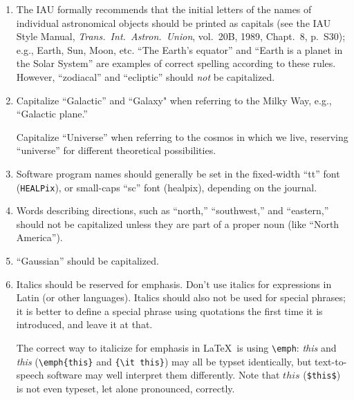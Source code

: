 \documentclass[letterpaper,11pt]{article}
\begin{document}
\begin{enumerate}
\item The IAU formally recommends that the initial letters of the names of
individual astronomical objects should be printed as capitals (see the IAU
Style Manual, {\it Trans.~Int.~Astron.~Union\/}, vol.~20B, 1989, Chapt.~8,
p.~S30); e.g., Earth, Sun, Moon, etc. ``The Earth's equator''
and ``Earth is a planet in the Solar System'' are examples of correct spelling
according to these rules.  However, ``zodiacal'' and ``ecliptic''
should {\it not\/} be capitalized.

\item Capitalize ``Galactic'' and ``Galaxy" when referring to the Milky Way, e.g.,
``Galactic plane.''

Capitalize ``Universe'' when referring to the cosmos in which we live,
reserving ``universe'' for different theoretical possibilities.


\item Software program names should generally be set in the fixed-width ``tt'' font ({\tt HEALPix}), or small-caps ``sc'' font ({\sc healpix}), depending on the journal.


\item  Words describing directions, such as ``north,'' ``southwest,'' and
``eastern,'' should not be capitalized unless they are part of a proper noun
(like ``North America'').


\item ``Gaussian''  should be capitalized.

\item
Italics should be reserved for emphasis.
Don't use italics for expressions in Latin (or other languages).  Italics should
also not be used for special phrases; it is better to define a special phrase
using quotations the first time it is introduced, and leave it at that.

The correct way to italicize for emphasis in La\TeX\ is using \verb|\emph|: \emph{this} and {\it this} (\verb|\emph{this}| and \verb|{\it this}|) may all be typset identically, but text-to-speech software may well interpret them differently. Note that $this$ (\verb|$this$|) is not even typeset, let alone pronounced, correctly.


\end{enumerate}
\end{document}
